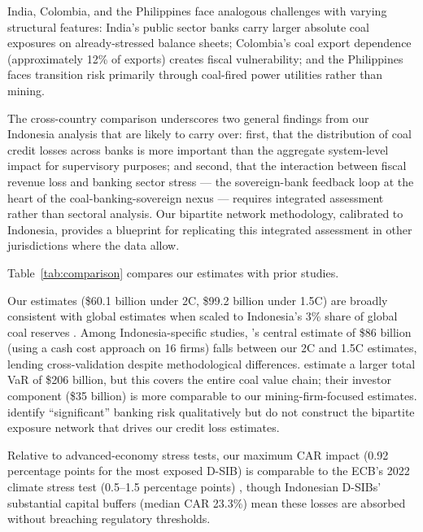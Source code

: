 India, Colombia, and the Philippines face analogous challenges with varying structural features: India's public sector banks carry larger absolute coal exposures on already-stressed balance sheets; Colombia's coal export dependence (approximately 12\% of exports) creates fiscal vulnerability; and the Philippines faces transition risk primarily through coal-fired power utilities rather than mining.

The cross-country comparison underscores two general findings from our Indonesia analysis that are likely to carry over: first, that the distribution of coal credit losses across banks is more important than the aggregate system-level impact for supervisory purposes; and second, that the interaction between fiscal revenue loss and banking sector stress --- the sovereign-bank feedback loop at the heart of the coal-banking-sovereign nexus --- requires integrated assessment rather than sectoral analysis. Our bipartite network methodology, calibrated to Indonesia, provides a blueprint for replicating this integrated assessment in other jurisdictions where the data allow.

Table~\ref{tab:comparison} compares our estimates with prior studies.



Our estimates (\$60.1 billion under 2\textdegree C, \$99.2 billion under 1.5\textdegree C) are broadly consistent with global estimates when scaled to Indonesia's 3\% share of global coal reserves \citep{Mercure2018}. Among Indonesia-specific studies, \citet{sonny2016}'s central estimate of \$86 billion (using a cash cost approach on 16 firms) falls between our 2\textdegree C and 1.5\textdegree C estimates, lending cross-validation despite methodological differences. \citet{Rishanty2023} estimate a larger total VaR of \$206 billion, but this covers the entire coal value chain; their investor component (\$35 billion) is more comparable to our mining-firm-focused estimates. \citet{IESR2023} identify ``significant'' banking risk qualitatively but do not construct the bipartite exposure network that drives our credit loss estimates.

Relative to advanced-economy stress tests, our maximum CAR impact (0.92 percentage points for the most exposed D-SIB) is comparable to the ECB's 2022 climate stress test (0.5--1.5 percentage points) \citep{ECB2022}, though Indonesian D-SIBs' substantial capital buffers (median CAR 23.3\%) mean these losses are absorbed without breaching regulatory thresholds.


